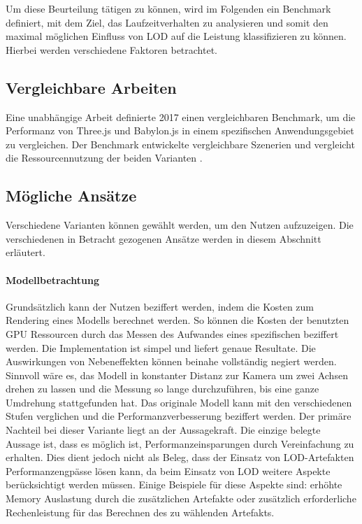 Um diese Beurteilung tätigen zu können, wird im Folgenden ein Benchmark definiert, mit dem Ziel, das Laufzeitverhalten zu analysieren und somit den maximal möglichen Einfluss von LOD auf die Leistung klassifizieren zu können. Hierbei werden verschiedene Faktoren betrachtet.

\subsection{Vergleichbare Arbeiten}
Eine unabhängige Arbeit definierte 2017 einen vergleichbaren Benchmark, um die Performanz von Three.js und Babylon.js in einem spezifischen Anwendungsgebiet zu vergleichen. Der Benchmark entwickelte vergleichbare Szenerien und vergleicht die Ressourcennutzung der beiden Varianten \cite{performanceComparisonBabylonThreejs}.

\subsection{Mögliche Ansätze}

Verschiedene Varianten können gewählt werden, um den Nutzen aufzuzeigen. Die verschiedenen in Betracht gezogenen Ansätze werden in diesem Abschnitt erläutert.

\paragraph{Modellbetrachtung}
Grundsätzlich kann der Nutzen beziffert werden, indem die Kosten zum Rendering eines Modells berechnet werden. So können die Kosten der benutzten GPU Ressourcen durch das Messen des Aufwandes eines spezifischen  beziffert werden. Die Implementation ist simpel und liefert genaue Resultate. Die Auswirkungen von Nebeneffekten können beinahe vollständig negiert werden.
Sinnvoll wäre es, das Modell in konstanter Distanz zur Kamera um zwei Achsen drehen zu lassen und die Messung so lange durchzuführen, bis eine ganze Umdrehung stattgefunden hat. Das originale Modell kann mit den verschiedenen Stufen verglichen und die Performanzverbesserung beziffert werden.
Der primäre Nachteil bei dieser Variante liegt an der Aussagekraft. Die einzige belegte Aussage ist, dass es möglich ist, Performanzeinsparungen durch Vereinfachung zu erhalten. Dies dient jedoch nicht als Beleg, dass der Einsatz von LOD-Artefakten Performanzengpässe lösen kann, da beim Einsatz von LOD weitere Aspekte berücksichtigt werden müssen. Einige Beispiele für diese Aspekte sind: erhöhte Memory Auslastung durch die zusätzlichen Artefakte oder zusätzlich erforderliche Rechenleistung für das Berechnen des zu wählenden Artefakts.

